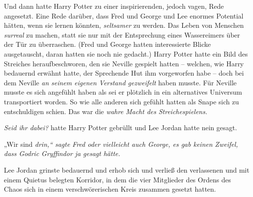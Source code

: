 Und dann hatte Harry Potter zu einer inspirierenden, jedoch vagen, Rede angesetzt. Eine Rede darüber, dass Fred und George und Lee enormes Potential hätten, wenn sie lernen könnten, \emph{seltsamer} zu werden. Das Leben von Menschen \emph{surreal} zu machen, statt sie nur mit der Entsprechung eines Wassereimers über der Tür zu überraschen. (Fred und George hatten interessierte Blicke ausgetauscht, daran hatten sie noch nie gedacht.) Harry Potter hatte ein Bild des Streiches heraufbeschworen, den sie Neville gespielt hatten -- welchen, wie Harry bedauernd erwähnt hatte, der Sprechende Hut ihm vorgeworfen habe -- doch bei dem Neville \emph{an seinem eigenen Verstand gezweifelt} haben musste. Für Neville musste es sich angefühlt haben als sei er plötzlich in ein alternatives Universum transportiert worden. So wie alle anderen sich gefühlt hatten als Snape sich zu entschuldigen schien. Das war die \emph{wahre Macht des Streichespielens.}

\emph{Seid ihr dabei?} hatte Harry Potter gebrüllt und Lee Jordan hatte nein gesagt.

„Wir sind \emph{drin,“ sagte Fred oder vielleicht auch George, es gab keinen Zweifel, dass Godric Gryffindor ja gesagt hätte.}

Lee Jordan grinste bedauernd und erhob sich und verließ den verlassenen und mit einem Quietus belegten Korridor, in dem die vier Mitglieder des Ordens des Chaos sich in einem verschwörerischen Kreis zusammen gesetzt hatten.

